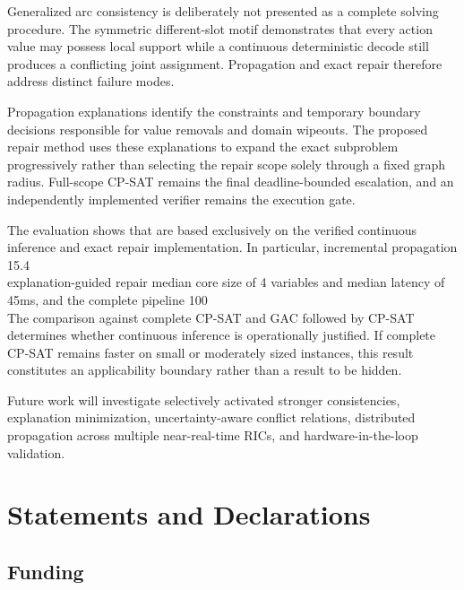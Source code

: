 \documentclass[pdflatex,sn-mathphys-num,iicol,oneside]{sn-jnl}
\begin{document}
Generalized arc consistency is deliberately not presented as a
complete solving procedure. The symmetric different-slot motif
demonstrates that every action value may possess local support while a
continuous deterministic decode still produces a conflicting joint
assignment. Propagation and exact repair therefore address distinct
failure modes.

Propagation explanations identify the constraints and temporary
boundary decisions responsible for value removals and domain wipeouts.
The proposed repair method uses these explanations to expand the exact
subproblem progressively rather than selecting the repair scope solely
through a fixed graph radius. Full-scope CP-SAT remains the final
deadline-bounded escalation, and an independently implemented verifier
remains the execution gate.

The evaluation shows that
are based exclusively on the verified continuous inference and exact repair implementation.
In particular, incremental propagation
15.4\\%
explanation-guided repair
median core size of 4 variables and median latency of 45ms, and the complete
pipeline
100\\%

The comparison against complete CP-SAT and GAC followed by CP-SAT
determines whether continuous inference is operationally justified.
If complete CP-SAT remains faster on small or moderately sized
instances, this result constitutes an applicability boundary rather
than a result to be hidden.

Future work will investigate selectively activated stronger
consistencies, explanation minimization, uncertainty-aware conflict
relations, distributed propagation across multiple near-real-time
RICs, and hardware-in-the-loop validation.

\section*{Statements and Declarations}

\subsection*{Funding}
\end{document}
